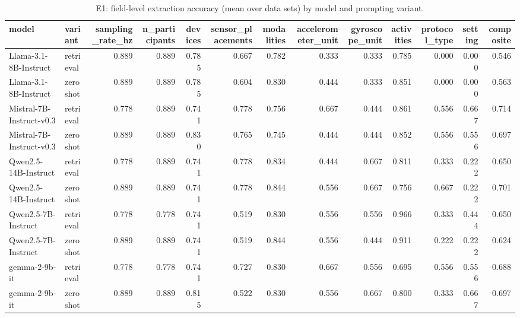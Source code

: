 \begin{table}
\caption{E1: field-level extraction accuracy (mean over data sets) by model and prompting variant.}
\label{tab:T2_extraction_field_scores}
\begin{tabular}{llrrrrrrrrrrr}
\toprule
model & variant & sampling\_rate\_hz & n\_participants & devices & sensor\_placements & modalities & accelerometer\_unit & gyroscope\_unit & activities & protocol\_type & setting & composite \\
\midrule
Llama-3.1-8B-Instruct & retrieval & 0.889 & 0.889 & 0.785 & 0.667 & 0.782 & 0.333 & 0.333 & 0.785 & 0.000 & 0.000 & 0.546 \\
Llama-3.1-8B-Instruct & zeroshot & 0.889 & 0.889 & 0.785 & 0.604 & 0.830 & 0.444 & 0.333 & 0.851 & 0.000 & 0.000 & 0.563 \\
Mistral-7B-Instruct-v0.3 & retrieval & 0.778 & 0.889 & 0.741 & 0.778 & 0.756 & 0.667 & 0.444 & 0.861 & 0.556 & 0.667 & 0.714 \\
Mistral-7B-Instruct-v0.3 & zeroshot & 0.889 & 0.889 & 0.830 & 0.765 & 0.745 & 0.444 & 0.444 & 0.852 & 0.556 & 0.556 & 0.697 \\
Qwen2.5-14B-Instruct & retrieval & 0.778 & 0.889 & 0.741 & 0.778 & 0.834 & 0.444 & 0.667 & 0.811 & 0.333 & 0.222 & 0.650 \\
Qwen2.5-14B-Instruct & zeroshot & 0.889 & 0.889 & 0.741 & 0.778 & 0.844 & 0.556 & 0.667 & 0.756 & 0.667 & 0.222 & 0.701 \\
Qwen2.5-7B-Instruct & retrieval & 0.778 & 0.778 & 0.741 & 0.519 & 0.830 & 0.556 & 0.556 & 0.966 & 0.333 & 0.444 & 0.650 \\
Qwen2.5-7B-Instruct & zeroshot & 0.889 & 0.889 & 0.741 & 0.519 & 0.844 & 0.556 & 0.444 & 0.911 & 0.222 & 0.222 & 0.624 \\
gemma-2-9b-it & retrieval & 0.778 & 0.778 & 0.741 & 0.727 & 0.830 & 0.667 & 0.556 & 0.695 & 0.556 & 0.556 & 0.688 \\
gemma-2-9b-it & zeroshot & 0.889 & 0.889 & 0.815 & 0.522 & 0.830 & 0.556 & 0.667 & 0.800 & 0.333 & 0.667 & 0.697 \\
\bottomrule
\end{tabular}
\end{table}

